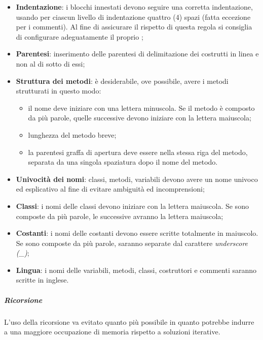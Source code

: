 				\begin{itemize}
					\item \textbf{Indentazione}: i blocchi innestati devono seguire una corretta indentazione, usando per ciascun livello di indentazione quattro (4) spazi (fatta eccezione per i commenti). Al fine di assicurare il rispetto di questa regola si consiglia di configurare adeguatamente il proprio ;
					\item \textbf{Parentesi}: inserimento delle parentesi di delimitazione dei costrutti in linea e non al di sotto di essi; 
					\item \textbf{Struttura dei metodi}: è desiderabile, ove possibile, avere i metodi strutturati in questo modo:
					\begin{itemize}
						\item il nome deve iniziare con una lettera minuscola. Se il metodo è composto da più parole, quelle successive devono iniziare con la lettera maiuscola;
						\item lunghezza del metodo breve;
						\item la parentesi graffa di apertura deve essere nella stessa riga del metodo, separata da una singola spaziatura dopo il nome del metodo.
					\end{itemize}
					\item \textbf{Univocità dei nomi}: classi, metodi, variabili devono avere un nome univoco ed esplicativo al fine di evitare ambiguità ed incomprensioni;
					\item \textbf{Classi}: i nomi delle classi devono iniziare con la lettera maiuscola. Se sono composte da più parole, le successive avranno la lettera maiuscola;
					\item \textbf{Costanti}: i nomi delle costanti devono essere scritte totalmente in maiuscolo. Se sono composte da più parole, saranno separate dal carattere \textit{underscore (\_)};
					\item \textbf{Lingua}: i nomi delle variabili, metodi, classi, costruttori e commenti saranno scritte in inglese.
				\end{itemize}
				\subparagraph{Ricorsione}
				L'uso della ricorsione va evitato quanto più possibile in quanto potrebbe indurre a una maggiore occupazione di memoria rispetto a soluzioni iterative.
		 		

